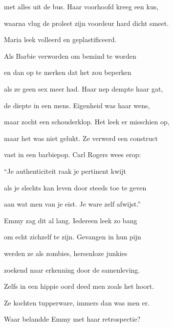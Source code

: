 met alles uit de bus.
Haar voorhoofd kreeg een kus,

waarna vlug de proleet
zijn voordeur hard dicht smeet.

Maria leek volleerd
en geplastificeerd.

Als Barbie verworden
om bemind te worden

en dan op te merken
dat het zou beperken

als ze geen sex meer had.
Haar nep dempte haar gat,

de diepte in een mens.
Eigenheid was haar wens,

maar zocht een schouderklop.
Het leek er misschien op,

maar het was niet gelukt.
Ze verwerd een construct

vast in een barbiepop.
Carl Rogers wees erop:

“Je authenticiteit
raak je pertinent kwijt

als je slechts kan leven
door steeds toe te geven

aan wat men van je eist.
Je ware zelf afwijst.”

Emmy zag dit al lang.
Iedereen leek zo bang

om echt zichzelf te zijn.
Gevangen in hun pijn

werden ze als zombies,
hersenloze junkies

zoekend naar erkenning
door de samenleving.

Zelfs in een hippie oord
deed men zoals het hoort.

Ze kochten tupperware,
immers dan was men er.

Waar belandde Emmy
met haar retrospectie?
